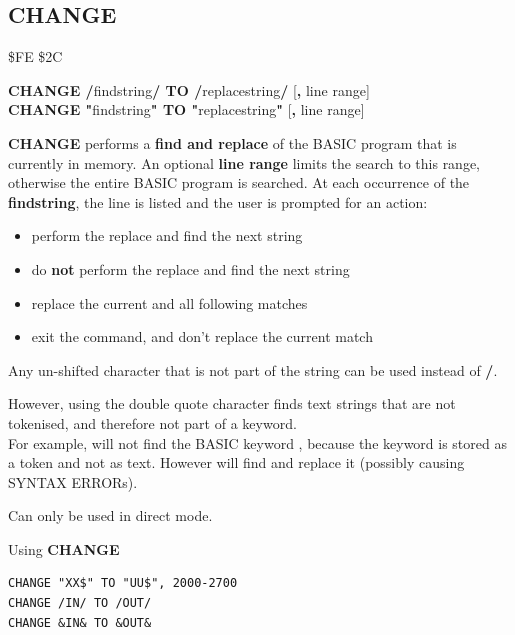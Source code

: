 \newpage
\subsection{CHANGE}
\begin{description}[leftmargin=2cm,style=nextline]
\item [Token:] \$FE \$2C
\item [Format:] {\bf CHANGE /}findstring{\bf/ TO /}replacestring{\bf/} [{\bf,} line range] \\
		{\bf CHANGE "}findstring{\bf" TO "}replacestring{\bf"} [{\bf,} line range]
\item [Usage:]  {\bf CHANGE} performs a {\bf find and replace} of the BASIC program
                that is currently in memory.
   An optional {\bf line range} limits the search to this range,
   otherwise the entire BASIC program is searched.
   At each occurrence of the {\bf findstring}, the line is
   listed and the user is prompted for an action:
    \begin{itemize}
      \item {}  perform the replace and find the next string
      \item {}  do {\bf not} perform the replace and find the next string
      \item \megakey{*}  replace the current and all following matches
      \item {} exit the command, and don't replace the current match
    \end{itemize}
\item [Remarks:] Any un-shifted character that is not part of the string can be
   used instead of {\bf /}.

   However, using the double quote character finds text strings that are
   not tokenised, and therefore not part of a keyword. \\
   For example,  will not find
   the BASIC keyword , because the
   keyword is stored as a token and not as text.
   However  will
   find and replace it (possibly causing SYNTAX ERRORs).

   Can only be used in direct mode.

\item [Examples:] Using {\bf CHANGE}
\begin{tcolorbox}[colback=black,coltext=white]
\verbatimfont{\codefont}
\begin{verbatim}
CHANGE "XX$" TO "UU$", 2000-2700
CHANGE /IN/ TO /OUT/
CHANGE &IN& TO &OUT&
\end{verbatim}
\end{tcolorbox}
\end{description}

